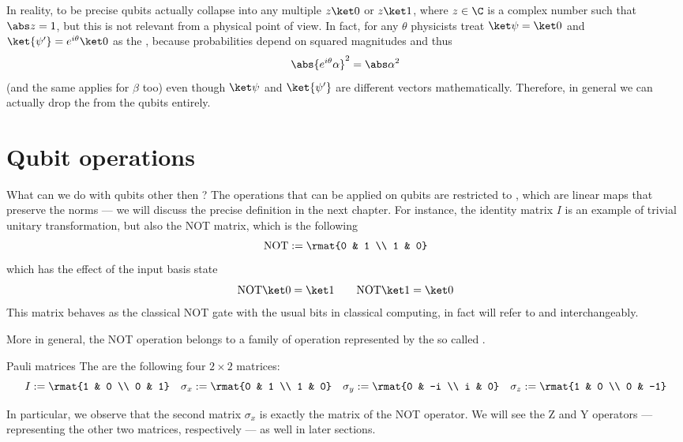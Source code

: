 \documentclass[a4paper, 12pt]{report}
\begin{document}
In reality, to be precise qubits actually collapse into any multiple $z \ket 0$ or $z\ket 1$, where $z \in \C$ is a complex number such that $\abs z = 1$, but this is not relevant from a physical point of view. In fact, for any $\theta$ physicists treat $\ket \psi = \ket 0$ and $\ket {\psi'} = e^{i \theta} \ket 0 $ as the , because probabilities depend on squared magnitudes and thus $$\abs{e^{i \theta} \alpha}^2 = \abs \alpha^2$$ (and the same applies for $\beta$ too) even though $\ket \psi$ and $\ket {\psi'}$ are different vectors mathematically. Therefore, in general we can actually drop the  from the qubits entirely.

\section{Qubit operations}

What can we do with qubits other then ? The operations that can be applied on qubits are restricted to , which are linear maps that preserve the norms --- we will discuss the precise definition in the next chapter. For instance, the identity matrix $I$ is an example of trivial unitary transformation, but also the NOT matrix, which is the following $$\mbox{NOT} := \rmat{0 & 1 \\ 1 & 0}$$ which has the effect of  the input basis state $$\mbox{NOT} \ket 0 = \ket 1 \quad \quad \mbox{NOT} \ket 1 = \ket 0$$ This matrix behaves as the classical NOT gate with the usual bits in classical computing, in fact will refer to  and  interchangeably.

More in general, the NOT operation belongs to a family of operation represented by the so called .

\begin{frameddefn}{Pauli matrices}
	The  are the following four $2 \times 2$ matrices: $$I := \rmat{1 & 0 \\ 0 & 1} \quad \sigma_x := \rmat{0 & 1 \\ 1 & 0} \quad \sigma_y := \rmat{0 & -i \\ i & 0} \quad \sigma_z := \rmat{1 & 0 \\ 0 & -1}$$
\end{frameddefn}

In particular, we observe that the second matrix $\sigma_x$ is exactly the matrix of the NOT operator. We will see the Z and Y operators --- representing the other two matrices, respectively --- as well in later sections.
\end{document}
